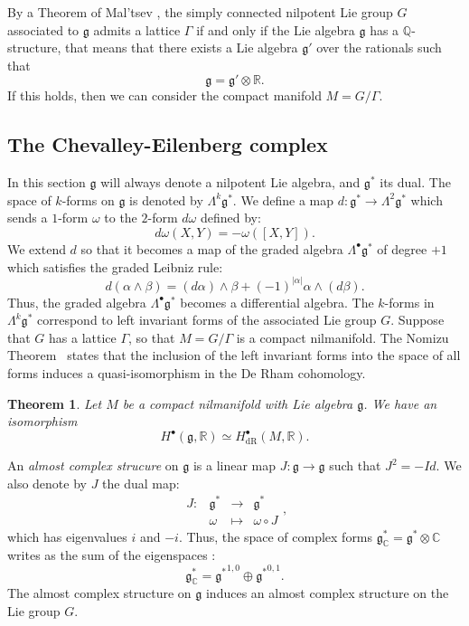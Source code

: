 \documentclass[leqno]{article}
\newtheorem{Theorem}[equation]{Theorem}
\theoremstyle{definition}
\numberwithin{equation}{section}
\begin{document}
By a Theorem of Mal'tsev \cite{AM}, the simply connected nilpotent Lie group $G$ associated to $\mathfrak{g}$ admits a lattice $\Gamma$ if and only if the Lie algebra $\mathfrak{g}$ has a $\mathbb{Q}$-structure, that means that there exists a Lie algebra $\mathfrak{g}'$ over the rationals such that 
\[
\mathfrak{g}
=
\mathfrak{g}' \otimes \mathbb{R}.
\]
If this holds, then we can consider the compact manifold $M = G / \Gamma$.

\subsection{The Chevalley-Eilenberg complex}
In this section $\mathfrak{g}$ will always denote a nilpotent Lie algebra, and $\mathfrak{g}^*$ its dual. The space of $k$-forms on $\mathfrak{g}$ is denoted by $\Lambda^k \mathfrak{g}^*$. 
We define a map 
$d: \mathfrak{g}^* \longrightarrow \Lambda^{2} \mathfrak{g}^*$
which sends a $1$-form $\omega$ to the $2$-form $d \omega$ defined by:
\[
d\omega(X, Y)
=
-\omega ([X, Y]).
\]
We extend $d$ so that it becomes a map of the graded algebra $\Lambda^{\bullet} \mathfrak{g}^*$ of degree $+1$ which satisfies the graded Leibniz rule:
\[
d(\alpha \wedge \beta)
=
(d\alpha) \wedge \beta
+
(-1)^{|\alpha|}\alpha \wedge (d\beta).
\]
Thus, the graded algebra $\Lambda^{\bullet}\mathfrak{g}^*$ becomes a differential algebra.
The $k$-forms in $\Lambda^k \mathfrak{g}^*$ correspond to left invariant forms of the associated Lie group $G$. Suppose that $G$ has a lattice $\Gamma$, so that $M = G/ \Gamma$ is a compact nilmanifold. The Nomizu Theorem~\cite{Nom} states that the inclusion of the left invariant forms into the space of all forms induces a quasi-isomorphism in the De Rham cohomology.
\begin{Theorem}
Let $M$ be a compact nilmanifold with Lie algebra $\mathfrak{g}$. We have an isomorphism
\[
H^{\bullet}(\mathfrak{g}, \mathbb{R})
\simeq
H^{\bullet}_{\text{dR}}(M, \mathbb{R}).
\]
\end{Theorem}

An {\sl almost complex strucure} on $\mathfrak{g}$ is a linear map $J : \mathfrak{g} \longrightarrow \mathfrak{g}$ such that
$
J^2
=
-Id$.
We also denote by $J$ the dual map:
\[
\begin{array}{cccc}
J : & \mathfrak{g}^{\ast} &\longrightarrow & \mathfrak{g}^{\ast}\\
& \omega & \mapsto &\omega \circ J
\end{array},
\]
which has eigenvalues $i$ and $-i$. Thus, the space of complex forms
$
\mathfrak{g}_{\mathbb{C}}^{\ast}
=
\mathfrak{g}^{\ast}
\otimes
\mathbb{C}
$
writes as the sum of the eigenspaces :
\[
\mathfrak{g}_{\mathbb{C}}^{\ast}
=
{\mathfrak{g}^*}^{1, 0}
\oplus
{\mathfrak{g}^*}^{0, 1}.
\]
The almost complex structure on $\mathfrak{g}$ induces an almost complex structure on the Lie group $G$. 
\end{document}
